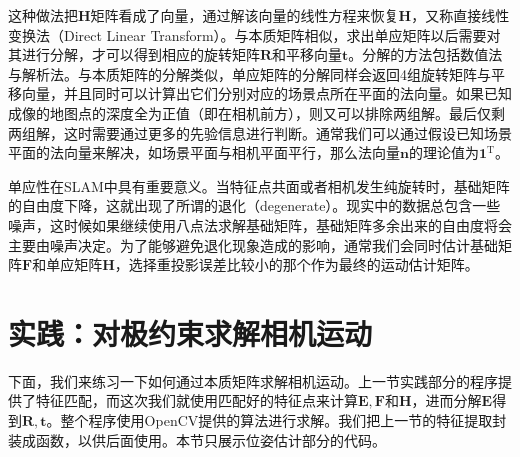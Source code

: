 这种做法把$\bm{H}$矩阵看成了向量，通过解该向量的线性方程来恢复$\bm{H}$，又称直接线性变换法（Direct Linear Transform）。与本质矩阵相似，求出单应矩阵以后需要对其进行分解，才可以得到相应的旋转矩阵$\bm{R}$和平移向量$\bm{t}$。分解的方法包括数值法\textsuperscript{\cite{faugeras1988motion, Zhang1996}}与解析法\textsuperscript{\cite{malis2007deeper}}。与本质矩阵的分解类似，单应矩阵的分解同样会返回4组旋转矩阵与平移向量，并且同时可以计算出它们分别对应的场景点所在平面的法向量。如果已知成像的地图点的深度全为正值（即在相机前方），则又可以排除两组解。最后仅剩两组解，这时需要通过更多的先验信息进行判断。通常我们可以通过假设已知场景平面的法向量来解决，如场景平面与相机平面平行，那么法向量$\bm{n}$的理论值为$\bm{1}^\mathrm{T}$。

单应性在SLAM中具有重要意义。当特征点共面或者相机发生纯旋转时，基础矩阵的自由度下降，这就出现了所谓的退化（degenerate）。现实中的数据总包含一些噪声，这时候如果继续使用八点法求解基础矩阵，基础矩阵多余出来的自由度将会主要由噪声决定。为了能够避免退化现象造成的影响，通常我们会同时估计基础矩阵$\bm{F}$和单应矩阵$\bm{H}$，选择重投影误差比较小的那个作为最终的运动估计矩阵。

\section{实践：对极约束求解相机运动}
下面，我们来练习一下如何通过本质矩阵求解相机运动。上一节实践部分的程序提供了特征匹配，而这次我们就使用匹配好的特征点来计算$\bm{E}, \bm{F}$和$\bm{H}$，进而分解$\bm{E}$得到$\bm{R}, \bm{t}$。整个程序使用OpenCV提供的算法进行求解。我们把上一节的特征提取封装成函数，以供后面使用。本节只展示位姿估计部分的代码。

